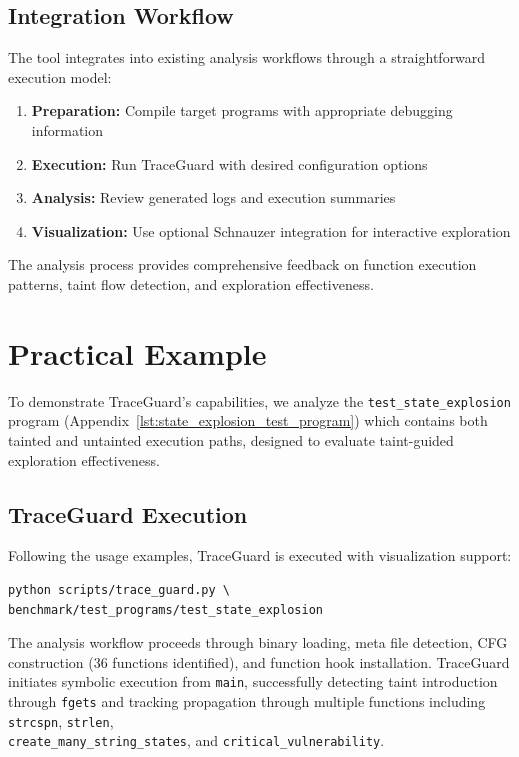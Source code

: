 \subsection{Integration Workflow}

The tool integrates into existing analysis workflows through a straightforward execution model:

\begin{enumerate}
    \item \textbf{Preparation:} Compile target programs with appropriate debugging information
    \item \textbf{Execution:} Run TraceGuard with desired configuration options
    \item \textbf{Analysis:} Review generated logs and execution summaries
    \item \textbf{Visualization:} Use optional Schnauzer integration for interactive exploration
\end{enumerate}

The analysis process provides comprehensive feedback on function execution patterns, taint flow detection, and exploration effectiveness.

\section{Practical Example}

To demonstrate TraceGuard's capabilities, we analyze the \texttt{test\_state\_explosion} program (Appendix~\ref{lst:state_explosion_test_program}) which contains both tainted and untainted execution paths, designed to evaluate taint-guided exploration effectiveness.

\subsection{TraceGuard Execution}

Following the usage examples, TraceGuard is executed with visualization support:


\begin{verbatim}
python scripts/trace_guard.py \
benchmark/test_programs/test_state_explosion
\end{verbatim}

The analysis workflow proceeds through binary loading, meta file detection, CFG construction (36 functions identified), and function hook installation. TraceGuard initiates symbolic execution from \texttt{main}, successfully detecting taint introduction through \texttt{fgets} and tracking propagation through multiple functions including \texttt{strcspn}, \texttt{strlen},\\
\texttt{create\_many\_string\_states}, and \texttt{critical\_vulnerability}.

